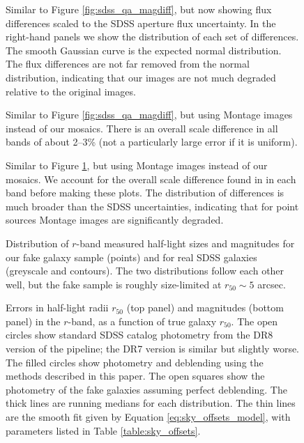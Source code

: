 \documentclass[10pt,preprint]{aastex}
\newcounter{thefigs}
\newcommand{\fignum}{\arabic{thefigs}}
\begin{document}
\clearpage
{}
\begin{figure}
\figurenum{\fignum}
\caption{\label{fig:sdss_qa_scaled} Similar to Figure
\ref{fig:sdss_qa_magdiff}, but now showing flux differences scaled to
the SDSS aperture flux uncertainty. In the right-hand panels we show
the distribution of each set of differences.  The smooth Gaussian
curve is the expected normal distribution. The flux differences are
not far removed from the normal distribution, indicating that our
images are not much degraded relative to the original images.}
\end{figure}


\clearpage
{}
\begin{figure}
\figurenum{\fignum}
\caption{\label{fig:montage_qa_magdiff} Similar to Figure
\ref{fig:sdss_qa_magdiff}, but using Montage images instead of our
mosaics. There is an overall scale difference in all bands of about
2--3\% (not a particularly large error if it is uniform). }
\end{figure}

\clearpage
{}
\begin{figure}
\figurenum{\fignum}
\caption{\label{fig:montage_qa_scaled} Similar to Figure
\ref{fig:sdss_qa_scaled}, but using Montage images instead of our
mosaics. We account for the overall scale difference found in in each band
before making these plots. The distribution of differences is much
broader than the SDSS uncertainties, indicating that for point sources
Montage images are significantly degraded.}
\end{figure}

\clearpage
{}
\begin{figure}
\figurenum{\fignum}
\caption{\label{fig:fakedist} Distribution of $r$-band measured
  half-light sizes and magnitudes for our fake galaxy sample (points)
  and for real SDSS galaxies (greyscale and contours). The two
  distributions follow each other well, but the fake sample is roughly
  size-limited at $r_{50} \sim 5$ arcsec.}
\end{figure}

\clearpage
{}
\begin{figure}
\figurenum{\fignum}
\caption{\label{fig:sky_offsets_ronly} Errors in half-light radii $r_{50}$
  (top panel) and magnitudes (bottom panel) in the $r$-band, as a
  function of true galaxy $r_{50}$. The open circles show standard
  SDSS catalog photometry from the DR8 version of the pipeline; the
  DR7 version is similar but slightly worse. The filled circles show
  photometry and deblending using the methods described in this paper.
  The open squares show the photometry of the fake galaxies assuming
  perfect deblending.  The thick lines are running medians for each
  distribution. The thin lines are the smooth fit given by Equation
  \ref{eq:sky_offsets_model}, with parameters listed in Table
  \ref{table:sky_offsets}.}
\end{figure}
\end{document}
